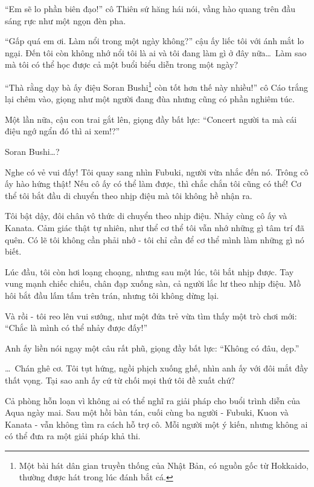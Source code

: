 \documentclass[../main.tex]{subfiles}
\begin{document}
``Em sẽ lo phần biên đạo!'' cô Thiên sứ hăng hái nói, vầng hào quang trên đầu sáng rực như một ngọn đèn pha.

``Gấp quá em ơi. Làm nổi trong một ngày không?'' cậu ấy liếc tôi với ánh mắt lo ngại. Đến tôi còn không nhớ nổi tôi là ai và tôi đang làm gì ở đây nữa\dots\ Làm sao mà tôi có thể học được cả một buổi biểu diễn trong một ngày?

``Thà rằng dạy bà ấy điệu Soran Bushi\footnote{Một bài hát dân gian truyền thống của Nhật Bản, có nguồn gốc từ Hokkaido, thường được hát trong lúc đánh bắt cá.} còn tốt hơn thế này nhiều!'' cô Cáo trắng lại chêm vào, giọng như một người đang đùa nhưng cũng có phần nghiêm túc.

Một lần nữa, cậu con trai gắt lên, giọng đầy bất lực: ``Concert người ta mà cái điệu ngớ ngẩn đó thì ai xem!?''

Soran Bushi\dots?

Nghe có vẻ vui đấy! Tôi quay sang nhìn Fubuki, người vừa nhắc đến nó. Trông cô ấy hào hứng thật! Nếu cô ấy có thể làm được, thì chắc chắn tôi cũng có thể! Cơ thể tôi bắt đầu di chuyển theo nhịp điệu mà tôi không hề nhận ra.


Tôi bật dậy, đôi chân vô thức di chuyển theo nhịp điệu. Nhảy cùng cô ấy và Kanata. Cảm giác thật tự nhiên, như thể cơ thể tôi vẫn nhớ những gì tâm trí đã quên. Có lẽ tôi không cần phải nhớ - tôi chỉ cần để cơ thể mình làm những gì nó biết.

Lúc đầu, tôi còn hơi loạng choạng, nhưng sau một lúc, tôi bắt nhịp được. Tay vung mạnh chiếc chiếu, chân đạp xuống sàn, cả người lắc lư theo nhịp điệu. Mồ hôi bắt đầu lấm tấm trên trán, nhưng tôi không dừng lại.

Và rồi - tôi reo lên vui sướng, như một đứa trẻ vừa tìm thấy một trò chơi mới: ``Chắc là mình có thể nhảy được đấy!''

Anh ấy liền nói ngay một câu rất phũ, giọng đầy bất lực: ``Không có đâu, dẹp.''

\dots\ Chán ghê cơ. Tôi tụt hứng, ngồi phịch xuống ghế, nhìn anh ấy với đôi mắt đầy thất vọng. Tại sao anh ấy cứ từ chối mọi thứ tôi đề xuất chứ?

\pov{-}

Cả phòng hỗn loạn vì không ai có thể nghĩ ra giải pháp cho buổi trình diễn của Aqua ngày mai. Sau một hồi bàn tán, cuối cùng ba người - Fubuki, Kuon và Kanata - vẫn không tìm ra cách hỗ trợ cô. Mỗi người một ý kiến, nhưng không ai có thể đưa ra một giải pháp khả thi.
\end{document}
